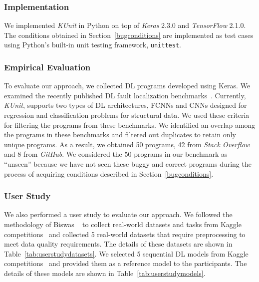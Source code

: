 \subsubsection{Implementation}
We implemented {\em KUnit} in Python on top of \textit{Keras} 2.3.0 and \textit{TensorFlow} 2.1.0. 
The conditions obtained in Section~\ref{bugconditions} are implemented as test cases using Python's built-in unit testing framework, \texttt{unittest}.


\subsubsection{Empirical Evaluation}
To evaluate our approach, we collected DL programs developed using Keras. 
We examined the recently published DL fault localization benchmarks~\cite{wardat21DeepLocalize,cao2022deepfd,ghanbari2023deepmufl}.
Currently, {\em KUnit}, supports two types of DL architectures, FCNNs and CNNs designed for regression and classification problems for structural data. 
We used these criteria for filtering the programs from these benchmarks.
We identified an overlap among the programs in these benchmarks and filtered out duplicates to retain only unique programs. As a result, we obtained 50 programs, 42 from \textit{Stack Overflow} and 8 from \textit{GitHub}.
We considered the 50 programs in our benchmark as ``unseen''
because we have not seen these buggy and correct programs during the process of acquiring 
conditions described in Section~\ref{bugconditions}.

\subsubsection{User Study}

We also performed a user study to evaluate our approach.
We followed
the methodology of Biswas \etal~\cite{biswas22art} to collect real-world datasets and tasks from Kaggle competitions~\cite{kaggle} and collected 5 real-world datasets that require preprocessing to meet data quality requirements. 
The details of these datasets are shown in Table~\ref{tab:userstudydatasets}. 
We selected 5 sequential DL models from Kaggle competitions~\cite{kaggle} and provided them as a reference model to the participants. 
The details of these models are shown in Table~\ref{tab:userstudymodels}.




